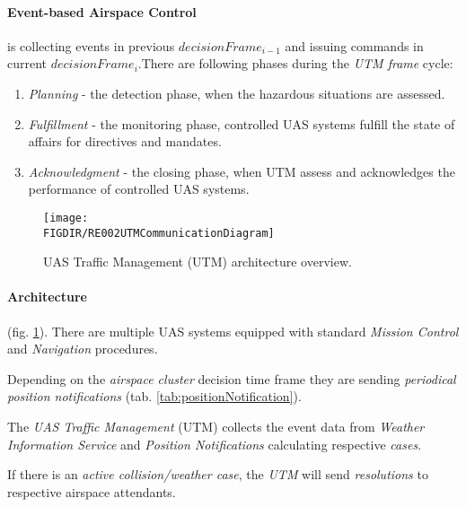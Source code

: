 \paragraph{Event-based Airspace Control} is collecting  events in  previous $decisionFrame_{i-1}$ and issuing commands in current $decisionFrame_i$.There are following phases during the \emph{UTM frame} cycle:
\begin{enumerate}
    \item \emph{Planning} - the detection phase, when the hazardous situations are assessed.
    
    \item \emph{Fulfillment} - the monitoring phase, controlled UAS systems fulfill the state of affairs for directives and mandates. 
    
    \item \emph{Acknowledgment} - the closing phase, when UTM assess and acknowledges the performance of controlled UAS systems.
\end{enumerate}


\begin{figure}[H]
    \centering
    \texttt{[image: \\FIGDIR/RE002UTMCommunicationDiagram]} 
    \caption{UAS Traffic Management (UTM) architecture overview.}
    \label{fig:UTMArchitectureOverview}
\end{figure}

\paragraph{Architecture} (fig. \ref{fig:UTMArchitectureOverview}).  There are multiple UAS systems equipped with standard \emph{Mission Control} and \emph{Navigation} procedures. 

Depending on the \emph{airspace cluster} decision time frame they are sending \emph{periodical position notifications} (tab. \ref{tab:positionNotification}).

The \emph{UAS Traffic Management} (UTM) collects the event data from \emph{Weather Information Service} and \emph{Position Notifications} calculating respective \emph{cases}. 

If there is an \emph{active collision/weather case}, the \emph{UTM} will send \emph{resolutions} to respective airspace attendants. 